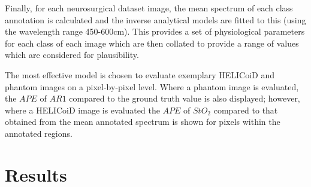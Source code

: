 Finally, for each neurosurgical dataset image, the mean spectrum of each class annotation is calculated and the inverse analytical models are fitted to this (using the wavelength range 450-600cm). This provides a set of physiological parameters for each class of each image which are then collated to provide a range of values which are considered for plausibility. %

The most effective model is chosen to evaluate exemplary HELICoiD and phantom images on a pixel-by-pixel level. Where a phantom image is evaluated, the $APE$ of $AR1$ compared to the ground truth value is also displayed; however, where a HELICoiD image is evaluated the $APE$ of $StO_2$ compared to that obtained from the mean annotated spectrum is shown for pixels within the annotated regions. 

\section{Results}

